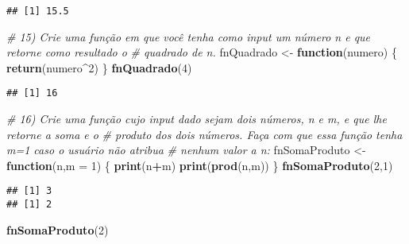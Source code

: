 \documentclass[]{article}
\newenvironment{Shaded}{\begin{snugshade}}{\end{snugshade}}
\newcommand{\CommentTok}[1]{\textcolor[rgb]{0.56,0.35,0.01}{\textit{#1}}}
\newcommand{\ControlFlowTok}[1]{\textcolor[rgb]{0.13,0.29,0.53}{\textbf{#1}}}
\newcommand{\DataTypeTok}[1]{\textcolor[rgb]{0.13,0.29,0.53}{#1}}
\newcommand{\DecValTok}[1]{\textcolor[rgb]{0.00,0.00,0.81}{#1}}
\newcommand{\KeywordTok}[1]{\textcolor[rgb]{0.13,0.29,0.53}{\textbf{#1}}}
\newcommand{\NormalTok}[1]{#1}
\newcommand{\OperatorTok}[1]{\textcolor[rgb]{0.81,0.36,0.00}{\textbf{#1}}}
\newcommand{\StringTok}[1]{\textcolor[rgb]{0.31,0.60,0.02}{#1}}
\begin{document}
\begin{Shaded}
\end{Shaded}

\begin{verbatim}
## [1] 15.5
\end{verbatim}

\begin{Shaded}
\begin{Highlighting}[]
\CommentTok{# 15) Crie uma função em que você tenha como input um número n e que retorne como resultado o}
\CommentTok{# quadrado de n.}
\NormalTok{fnQuadrado <-}\StringTok{ }\ControlFlowTok{function}\NormalTok{(numero) }
\NormalTok{\{}
  \KeywordTok{return}\NormalTok{(numero}\OperatorTok{^}\DecValTok{2}\NormalTok{)}
\NormalTok{\}}
\KeywordTok{fnQuadrado}\NormalTok{(}\DecValTok{4}\NormalTok{)}
\end{Highlighting}
\end{Shaded}

\begin{verbatim}
## [1] 16
\end{verbatim}

\begin{Shaded}
\begin{Highlighting}[]
\CommentTok{# 16) Crie uma função cujo input dado sejam dois números, n e m, e que lhe retorne a soma e o}
\CommentTok{# produto dos dois números. Faça com que essa função tenha m=1 caso o usuário não atribua}
\CommentTok{# nenhum valor a n:}
\NormalTok{fnSomaProduto <-}\StringTok{ }\ControlFlowTok{function}\NormalTok{(n,}\DataTypeTok{m =} \DecValTok{1}\NormalTok{) }
\NormalTok{\{}
  \KeywordTok{print}\NormalTok{(n}\OperatorTok{+}\NormalTok{m)}
  \KeywordTok{print}\NormalTok{(}\KeywordTok{prod}\NormalTok{(n,m))}
\NormalTok{\}}
\KeywordTok{fnSomaProduto}\NormalTok{(}\DecValTok{2}\NormalTok{,}\DecValTok{1}\NormalTok{)}
\end{Highlighting}
\end{Shaded}

\begin{verbatim}
## [1] 3
## [1] 2
\end{verbatim}

\begin{Shaded}
\begin{Highlighting}[]
\KeywordTok{fnSomaProduto}\NormalTok{(}\DecValTok{2}\NormalTok{)}
\end{Highlighting}
\end{Shaded}
\end{document}
